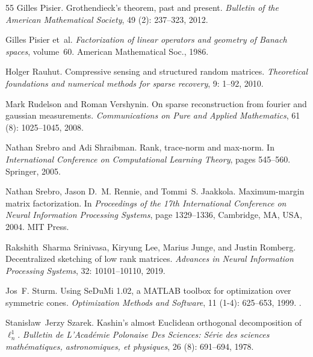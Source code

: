 \documentclass[11pt]{article}
\begin{document}
\begin{thebibliography}{55}
Gilles Pisier.
\newblock Grothendieck’s theorem, past and present.
\newblock \emph{Bulletin of the American Mathematical Society}, 49
  (2): 237--323, 2012.

Gilles Pisier et~al.
\newblock \emph{Factorization of linear operators and geometry of Banach
  spaces}, volume~60.
\newblock American Mathematical Soc., 1986.

Holger Rauhut.
\newblock Compressive sensing and structured random matrices.
\newblock \emph{Theoretical foundations and numerical methods for sparse
  recovery}, 9: 1--92, 2010.

Mark Rudelson and Roman Vershynin.
\newblock On sparse reconstruction from fourier and gaussian measurements.
\newblock \emph{Communications on Pure and Applied Mathematics}, 61
  (8): 1025--1045, 2008.

Nathan Srebro and Adi Shraibman.
\newblock Rank, trace-norm and max-norm.
\newblock In \emph{International Conference on Computational Learning Theory},
  pages 545--560. Springer, 2005.

Nathan Srebro, Jason D.~M. Rennie, and Tommi~S. Jaakkola.
\newblock Maximum-margin matrix factorization.
\newblock In \emph{Proceedings of the 17th International Conference on Neural
  Information Processing Systems}, page 1329–1336, Cambridge, MA, USA, 2004.
  MIT Press.

Rakshith~Sharma Srinivasa, Kiryung Lee, Marius Junge, and Justin Romberg.
\newblock Decentralized sketching of low rank matrices.
\newblock \emph{Advances in Neural Information Processing Systems},
  32: 10101--10110, 2019.

Jos~F. Sturm.
\newblock Using {SeDuMi} 1.02, a {MATLAB} toolbox for optimization over
  symmetric cones.
\newblock \emph{Optimization Methods and Software}, 11 (1-4):
  625--653, 1999.
\newblock {}.

Stanis{\l}aw~Jerzy Szarek.
\newblock Kashin's almost {E}uclidean orthogonal decomposition of $\ell_n^1$.
\newblock \emph{Bulletin de L'Acad\'emie Polonaise Des Sciences: S\'erie des
  sciences math\'ematiques, astronomiques, et physiques}, 26
  (8): 691--694, 1978.


\end{thebibliography}
\end{document}
